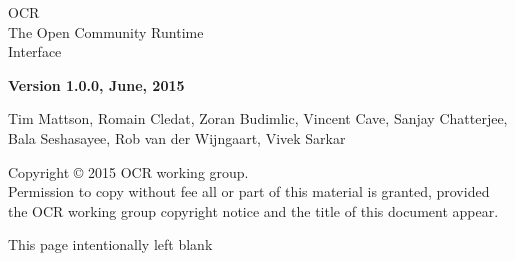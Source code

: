 
\begin{titlepage}

  \begin{adjustwidth}{-0.75in}{0in}
    \begin{center}
      \Huge
      \textsf{OCR\\The Open Community Runtime \\Interface}

      \vspace{0.5in}\textsf{ }\vspace{-0.7in}
      \normalsize
      \vspace{1.0in}
      \textbf{Version 1.0.0, June, 2015}
      \vspace{1.0in}

Tim Mattson, Romain Cledat, Zoran Budimlic,
Vincent Cave, Sanjay Chatterjee,  Bala Seshasayee, Rob van der Wijngaart,
Vivek Sarkar
    \end{center}
  \end{adjustwidth}
  \vspace{2.0in}

  \begin{adjustwidth}{0pt}{1em}\setlength{\parskip}{0.25\baselineskip}%
Copyright © 2015 OCR working group.\\
Permission to copy without fee all or part of this material is granted,
provided the OCR working group copyright notice and
the title of this document appear.
  \end{adjustwidth}
\end{titlepage}


\clearpage
\thispagestyle{empty}
\phantom{a}
This page intentionally left blank
\vfill
